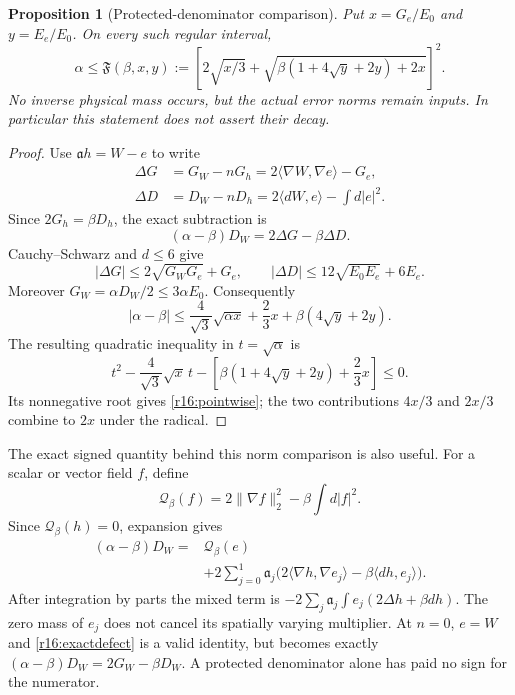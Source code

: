 \documentclass[11pt]{article}
\numberwithin{equation}{section}
\newtheorem{proposition}[theorem]{Proposition}
\begin{document}
\begin{proposition}[Protected-denominator comparison]
\label{r16:envelope}
Put $x=G_e/E_0$ and $y=E_e/E_0$. On every such regular interval,
\begin{equation}\label{r16:pointwise}
 \alpha\le\mathfrak F(\beta,x,y):=
 \left[2\sqrt{x/3}+
 \sqrt{\beta(1+4\sqrt y+2y)+2x}\right]^2.
\end{equation}
No inverse physical mass occurs, but the actual error norms remain
inputs. In particular this statement does not assert their decay.
\end{proposition}
\begin{proof}
Use $\mathfrak ah=W-e$ to write
\begin{align*}
 \Delta G&=G_W-nG_h
       =2\langle\nabla W,\nabla e\rangle-G_e,\\
 \Delta D&=D_W-nD_h
       =2\langle dW,e\rangle-\int d|e|^2.
\end{align*}
Since $2G_h=\beta D_h$, the exact subtraction is
\begin{equation}\label{r16:exactdefect}
 (\alpha-\beta)D_W=2\Delta G-\beta\Delta D.
\end{equation}
Cauchy--Schwarz and $d\le6$ give
\[
 |\Delta G|\le2\sqrt{G_WG_e}+G_e,\qquad
 |\Delta D|\le12\sqrt{E_0E_e}+6E_e.
\]
Moreover $G_W=\alpha D_W/2\le3\alpha E_0$. Consequently
\begin{equation}\label{r16:quadraticbound}
 |\alpha-\beta|\le\frac4{\sqrt3}\sqrt{\alpha x}
                   +\frac23x+\beta(4\sqrt y+2y).
\end{equation}
The resulting quadratic inequality in $t=\sqrt\alpha$ is
\[
 t^2-\frac4{\sqrt3}\sqrt x\,t
       -\left[\beta(1+4\sqrt y+2y)+\frac23x\right]\le0.
\]
Its nonnegative root gives \eqref{r16:pointwise}; the two contributions
$4x/3$ and $2x/3$ combine to $2x$ under the radical.
\end{proof}

The exact signed quantity behind this norm comparison is also useful.
For a scalar or vector field $f$, define
\[
 \mathscr Q_\beta(f)=2\|\nabla f\|_2^2-\beta\int d|f|^2.
\]
Since $\mathscr Q_\beta(h)=0$, expansion gives
\begin{equation}\label{r16:signeddefect}
 \begin{split}
 (\alpha-\beta)D_W={}&\mathscr Q_\beta(e)\\
 &+2\sum_{j=0}^1\mathfrak a_j
  \bigl(2\langle\nabla h,\nabla e_j\rangle
                         -\beta\langle dh,e_j\rangle\bigr).
 \end{split}
\end{equation}
After integration by parts the mixed term is
$-2\sum_j\mathfrak a_j\int e_j(2\Delta h+\beta dh)$.
The zero mass of $e_j$ does not cancel its spatially varying multiplier.
At $n=0$, $e=W$ and \eqref{r16:exactdefect} is a valid identity,
but becomes exactly $(\alpha-\beta)D_W=2G_W-\beta D_W$.
A protected denominator alone has paid no sign for the numerator.
\end{document}

